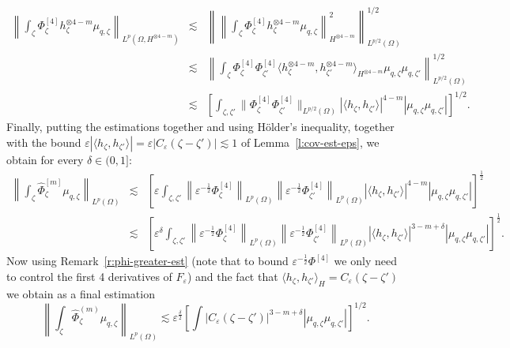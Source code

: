 \begin{eqnarray*}
  \left\| \int_{\zeta} \Phi^{[4]}_{\zeta} h^{\otimes 4 - m}_{\zeta} \mu_{q,
  \zeta} \right\|_{L^p (\Omega, H^{\otimes 4 - m})} & \lesssim & \left\|
  \left\| \int_{\zeta} \Phi_{\zeta}^{[4]} h_{\zeta}^{\otimes 4 - m} \mu_{q,
  \zeta} \right\|^2_{H^{\otimes 4 - m}} \right\|_{L^{p / 2} (\Omega)}^{1 /
  2}\\
  & \lesssim & \left\| \int_{\zeta} \Phi_{\zeta}^{[4]} \Phi_{\zeta'}^{[4]}
  \langle h_{\zeta}^{\otimes 4 - m}, h_{\zeta'}^{\otimes 4 - m}
  \rangle_{H^{\otimes 4 - m}} \mu_{q, \zeta} \mu_{q, \zeta'}  \right\|_{L^{p /
  2} (\Omega)}^{1 / 2}\\
  & \lesssim & \left[ \int_{\zeta, \zeta'} \| \Phi_{\zeta}^{[4]}
  \Phi_{\zeta'}^{[4]} \|_{L^{p / 2} (\Omega)}  | \langle h_{\zeta}, h_{\zeta'}
  \rangle |^{4 - m}  | \mu_{q, \zeta} \mu_{q, \zeta'} | \right]^{1 / 2} .
\end{eqnarray*}
Finally, putting the estimations together and using H{\"o}lder's inequality,
together with the bound $\varepsilon | \langle h_{\zeta}, h_{\zeta'} \rangle |
= \varepsilon | C_{\varepsilon} (\zeta - \zeta') | \lesssim 1$ of
Lemma~\ref{l:cov-est-eps}, we obtain for every $\delta \in (0, 1]$:
\begin{eqnarray*}
  \left\| \int_{\zeta} \hat{\Phi}^{[m]}_{\zeta} \mu_{q, \zeta} \right\|_{L^p
  (\Omega)} & \lesssim & \left[ \varepsilon \int_{\zeta, \zeta'} \left\|
  \varepsilon^{- \frac{1}{2}} \Phi^{[4]}_{\zeta} \right\|_{L^p (\Omega)}
  \left\| \varepsilon^{- \frac{1}{2}} \Phi^{[4]}_{\zeta'} \right\|_{L^p
  (\Omega)} | \langle h_{\zeta}, h_{\zeta'} \rangle |^{4 - m} | \mu_{q, \zeta}
  \mu_{q, \zeta'}  | \right]^{\frac{1}{2}}\\
  & \lesssim & \left[ \varepsilon^{\delta} \int_{\zeta, \zeta'} \left\|
  \varepsilon^{- \frac{1}{2}} \Phi^{[4]}_{\zeta} \right\|_{L^p (\Omega)}
  \left\| \varepsilon^{- \frac{1}{2}} \Phi^{[4]}_{\zeta'} \right\|_{L^p
  (\Omega)} | \langle h_{\zeta}, h_{\zeta'} \rangle |^{3 - m + \delta} |
  \mu_{q, \zeta} \mu_{q, \zeta'}  | \right]^{\frac{1}{2}} .
\end{eqnarray*}
Now using Remark~\ref{r:phi-greater-est} (note that to bound $\varepsilon^{-
\frac{1}{2}} \Phi^{[4]}$ we only need to control the first 4 derivatives of
$F_{\varepsilon}$) and the fact that $\langle h_{\zeta}, h_{\zeta'} \rangle_H
= C_{\varepsilon} (\zeta - \zeta')$ we obtain as a final estimation
\begin{equation}
  \left\| \int_{\zeta} \hat{\Phi}^{(m)}_{\zeta} \mu_{q, \zeta} \right\|_{L^p
  (\Omega)} \lesssim \varepsilon^{\frac{\delta}{2}} \left[ \int |
  C_{\varepsilon} (\zeta - \zeta') |^{3 - m + \delta}  | \mu_{q, \zeta}
  \mu_{q, \zeta'}  | \right]^{1 / 2} . \label{e:firstorder-last-estim}
\end{equation}


